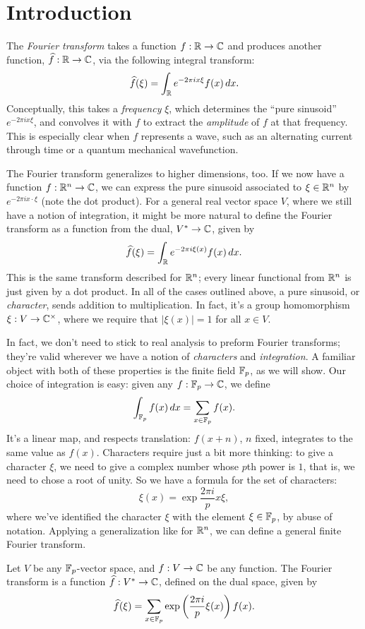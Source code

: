\section{Introduction}\label{sec:intro}

The \emph{Fourier transform} takes a function $f:\mathbb{R}\to\mathbb{C}$ and produces another
function, $\widehat{f}:\mathbb{R}\to\mathbb{C}$, via the following integral transform:
\[ \widehat{f}(\xi) = \int_{\mathbb{R}} e^{-2\pi i x \xi} f(x)\, dx. \]
Conceptually, this takes a \emph{frequency} $\xi$, which determines the ``pure sinusoid''
$e^{-2\pi i x \xi}$, and convolves it with $f$ to extract the \emph{amplitude} of $f$ 
at that frequency. This is especially clear when $f$ represents a wave, such as an alternating
current through time or a quantum mechanical wavefunction. 

The Fourier transform generalizes to higher dimensions, too. If we now have a function
$f:\mathbb{R}^n\to\mathbb{C}$, we can express the pure sinusoid associated to $\xi\in\mathbb{R}^n$ by 
$e^{-2\pi i x\cdot\xi}$ (note the dot product). For a general real vector space $V$, where
we still have a notion of integration, it might be more natural to define the 
Fourier transform as a function from the dual, $V^* \to \mathbb{C}$, given by
\[ \widehat{f}(\xi) = \int_{\mathbb{R}} e^{-2\pi i \xi(x)} f(x)\, dx. \]
This is the same transform described for $\mathbb{R}^n$; every linear functional from $\mathbb{R}^n$ is
just given by a dot product. In all of the cases outlined above, a pure sinusoid, or
\emph{character}, sends addition to multiplication. In fact, it's a group homomorphism 
$\xi:V \to \mathbb{C}^\times$, where we require that $|\xi(x)| = 1$ for all $x\in V$.

In fact, we don't need to stick to real analysis to preform Fourier transforms; they're
valid wherever we have a notion of \emph{characters}
and \emph{integration}. A familiar object with both of these properties is the finite field
$\mathbb{F}_p$, as we will show. Our choice of integration is easy: given any $f:\mathbb{F}_p\to\mathbb{C}$, we define
\[ \int_{\mathbb{F}_p} f(x)\, dx = \sum_{x\in\mathbb{F}_p} f(x). \]
It's a linear map, and respects translation: $f(x + n)$, $n$ fixed, integrates to the 
same value as $f(x)$. Characters require just a bit more thinking: to give a character 
$\xi$, we need to give a complex number whose $p$th power is $1$, that is, we need
to chose a root of unity. So we have a formula for the set of characters:
\[ \xi(x) = \exp {\frac{2\pi i}{p} x \xi}, \]
where we've identified the character $\xi$ with the element $\xi\in\mathbb{F}_p$, by
abuse of notation. Applying a generalization like for $\mathbb{R}^n$, we can define a general
finite Fourier transform.
\begin{defn}
    Let $V$ be any $\mathbb{F}_p$-vector space, and $f:V\to \mathbb{C}$ be any function. The Fourier
    transform is a function $\widehat{f}:V^*\to\mathbb{C}$, defined on the dual space, given by
    \[ \widehat{f}(\xi) = 
        \sum_{x\in\mathbb{F}_p} \exp \left(\frac{2\pi i}{p} \xi(x)\right) f(x). \]
\end{defn}

